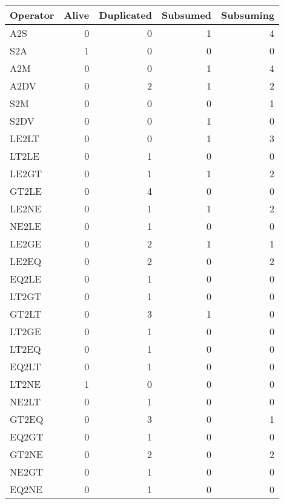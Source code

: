 \begin{tabular}{lrrrr}
    \toprule
    Operator & Alive & Duplicated & Subsumed & Subsuming \\
    \midrule
            A2S & 0 & 0 & 1 & 4 \\
            S2A & 1 & 0 & 0 & 0 \\
            A2M & 0 & 0 & 1 & 4 \\
            A2DV & 0 & 2 & 1 & 2 \\
            S2M & 0 & 0 & 0 & 1 \\
            S2DV & 0 & 0 & 1 & 0 \\
    \midrule
            LE2LT & 0 & 0 & 1 & 3 \\
            LT2LE & 0 & 1 & 0 & 0 \\
            LE2GT & 0 & 1 & 1 & 2 \\
            GT2LE & 0 & 4 & 0 & 0 \\
            LE2NE & 0 & 1 & 1 & 2 \\
            NE2LE & 0 & 1 & 0 & 0 \\
            LE2GE & 0 & 2 & 1 & 1 \\
            LE2EQ & 0 & 2 & 0 & 2 \\
            EQ2LE & 0 & 1 & 0 & 0 \\
            LT2GT & 0 & 1 & 0 & 0 \\
            GT2LT & 0 & 3 & 1 & 0 \\
            LT2GE & 0 & 1 & 0 & 0 \\
            LT2EQ & 0 & 1 & 0 & 0 \\
            EQ2LT & 0 & 1 & 0 & 0 \\
            LT2NE & 1 & 0 & 0 & 0 \\
            NE2LT & 0 & 1 & 0 & 0 \\
            GT2EQ & 0 & 3 & 0 & 1 \\
            EQ2GT & 0 & 1 & 0 & 0 \\
            GT2NE & 0 & 2 & 0 & 2 \\
            NE2GT & 0 & 1 & 0 & 0 \\
            EQ2NE & 0 & 1 & 0 & 0 \\

\end{tabular}

